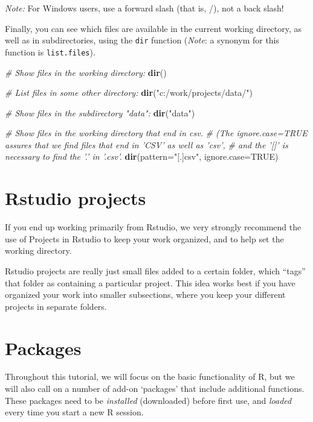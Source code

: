 \documentclass[]{book}
\newenvironment{Shaded}{\begin{snugshade}}{\end{snugshade}}
\newcommand{\CommentTok}[1]{\textcolor[rgb]{0.56,0.35,0.01}{\textit{#1}}}
\newcommand{\DataTypeTok}[1]{\textcolor[rgb]{0.13,0.29,0.53}{#1}}
\newcommand{\KeywordTok}[1]{\textcolor[rgb]{0.13,0.29,0.53}{\textbf{#1}}}
\newcommand{\NormalTok}[1]{#1}
\newcommand{\OtherTok}[1]{\textcolor[rgb]{0.56,0.35,0.01}{#1}}
\newcommand{\StringTok}[1]{\textcolor[rgb]{0.31,0.60,0.02}{#1}}
\begin{document}
\emph{Note:} For Windows users, use a forward slash (that is, /), not a back slash!

Finally, you can see which files are available in the current working directory, as well as in subdirectories, using the \texttt{dir} function (\emph{Note}: a synonym for this function is \texttt{list.files}).

\begin{Shaded}
\begin{Highlighting}[]
\CommentTok{# Show files in the working directory:}
\KeywordTok{dir}\NormalTok{()}

\CommentTok{# List files in some other directory:}
\KeywordTok{dir}\NormalTok{(}\StringTok{"c:/work/projects/data/"}\NormalTok{)}

\CommentTok{# Show files in the subdirectory "data":}
\KeywordTok{dir}\NormalTok{(}\StringTok{"data"}\NormalTok{)}

\CommentTok{# Show files in the working directory that end in csv.}
\CommentTok{# (The ignore.case=TRUE assures that we find files that end in 'CSV' as well as 'csv',}
\CommentTok{# and the '[]' is necessary to find the '.' in '.csv'.}
\KeywordTok{dir}\NormalTok{(}\DataTypeTok{pattern=}\StringTok{"[.]csv"}\NormalTok{, }\DataTypeTok{ignore.case=}\OtherTok{TRUE}\NormalTok{)}
\end{Highlighting}
\end{Shaded}

\hypertarget{rstudio-projects}{%
\section{Rstudio projects}\label{rstudio-projects}}

If you end up working primarily from Rstudio, we very strongly recommend the use of Projects in Rstudio to keep your work organized, and to help set the working directory.

Rstudio projects are really just small files added to a certain folder, which ``tags'' that folder as containing a particular project. This idea works best if you have organized your work into smaller subsections, where you keep your different projects in separate folders.

\hypertarget{packages}{%
\section{Packages}\label{packages}}

Throughout this tutorial, we will focus on the basic functionality of R, but we will also call on a number of add-on `packages' that include additional functions. These packages need to be \emph{installed} (downloaded) before first use, and \emph{loaded} every time you start a new R session.
\end{document}
